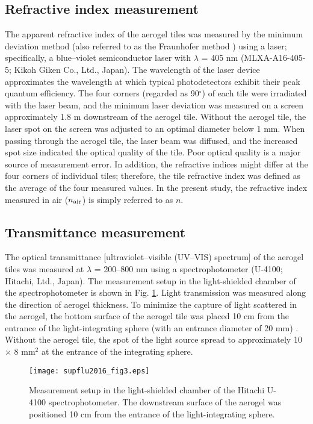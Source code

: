 \documentclass[5p,twocolumn]{elsarticle}
\begin{document}
\subsection{Refractive index measurement}
\label{4-1}

The apparent refractive index of the aerogel tiles was measured by the minimum deviation method (also referred to as the Fraunhofer method \cite{cite2}) using a laser; specifically, a blue--violet semiconductor laser with $\lambda $ = 405 nm (MLXA-A16-405-5; Kikoh Giken Co., Ltd., Japan). The wavelength of the laser device approximates the wavelength at which typical photodetectors exhibit their peak quantum efficiency. The four corners (regarded as 90$^{\circ }$) of each tile were irradiated with the laser beam, and the minimum laser deviation was measured on a screen approximately 1.8 m downstream of the aerogel tile. Without the aerogel tile, the laser spot on the screen was adjusted to an optimal diameter below 1 mm. When passing through the aerogel tile, the laser beam was diffused, and the increased spot size indicated the optical quality of the tile. Poor optical quality is a major source of measurement error. In addition, the refractive indices might differ at the four corners of individual tiles; therefore, the tile refractive index was defined as the average of the four measured values. In the present study, the refractive index measured in air ($n_{\rm {air}}$) is simply referred to as $n$.

\subsection{Transmittance measurement}
\label{4-2}

The optical transmittance [ultraviolet--visible (UV--VIS) spectrum] of the aerogel tiles was measured at $\lambda $ = 200--800 nm using a spectrophotometer (U-4100; Hitachi, Ltd., Japan). The measurement setup in the light-shielded chamber of the spectrophotometer is shown in Fig. \ref{fig:fig3}. Light transmission was measured along the direction of aerogel thickness. To minimize the capture of light scattered in the aerogel, the bottom surface of the aerogel tile was placed 10 cm from the entrance of the light-integrating sphere (with an entrance diameter of 20 mm) \cite{cite2}. Without the aerogel tile, the spot of the light source spread to approximately 10 $\times $ 8 mm$^2$ at the entrance of the integrating sphere.

\begin{figure}[t]
\centering 
\texttt{[image: supflu2016\_fig3.eps]}
\caption{Measurement setup in the light-shielded chamber of the Hitachi U-4100 spectrophotometer. The downstream surface of the aerogel was positioned 10 cm from the entrance of the light-integrating sphere.}
\label{fig:fig3}
\end{figure}
\end{document}
